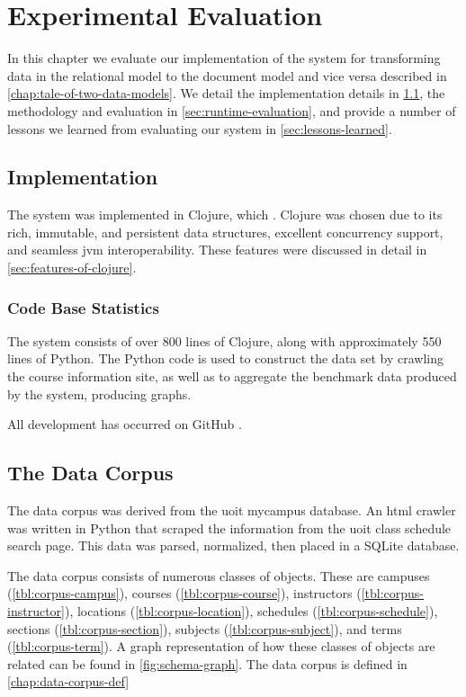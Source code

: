 \chapter{Experimental Evaluation}
\label{chap:experimental-evaluation}
	In this chapter we evaluate our implementation of the system for transforming data in the relational model to the document model and vice versa described in \cref{chap:tale-of-two-data-models}.  We detail the implementation details in \cref{sec:implementation}, the methodology and evaluation in \cref{sec:runtime-evaluation}, and provide a number of lessons we learned from evaluating our system in \cref{sec:lessons-learned}.
	
	\section{Implementation}
	\label{sec:implementation}
		The system was implemented in Clojure, which .  Clojure was chosen due to its rich, immutable, and persistent data structures, excellent concurrency support, and seamless \gls{jvm} interoperability.  These features were discussed in detail in \cref{sec:features-of-clojure}.
		
		\subsection{Code Base Statistics}
			The system consists of over 800 lines of Clojure, along with approximately 550 lines of Python.  The Python code is used to construct the data set by crawling the course information site, as well as to aggregate the benchmark data produced by the system, producing graphs.
			
			All development has occurred on GitHub \cite{molly-repo}. 
	
	\section{The Data Corpus}
	\label{sec:data-corpus}
		The data corpus was derived from the \gls{uoit} mycampus database.  An \gls{html} crawler was written in Python that scraped the information from the \gls{uoit} class schedule search page.  This data was parsed, normalized, then placed in a SQLite database.
		
		The data corpus consists of numerous classes of objects.  These are campuses (\cref{tbl:corpus-campus}), courses (\cref{tbl:corpus-course}), instructors (\cref{tbl:corpus-instructor}), locations (\cref{tbl:corpus-location}), schedules (\cref{tbl:corpus-schedule}), sections (\cref{tbl:corpus-section}), subjects (\cref{tbl:corpus-subject}), and terms (\cref{tbl:corpus-term}).  A graph representation of how these classes of objects are related can be found in \cref{fig:schema-graph}.  The data corpus is defined in \cref{chap:data-corpus-def}
		
